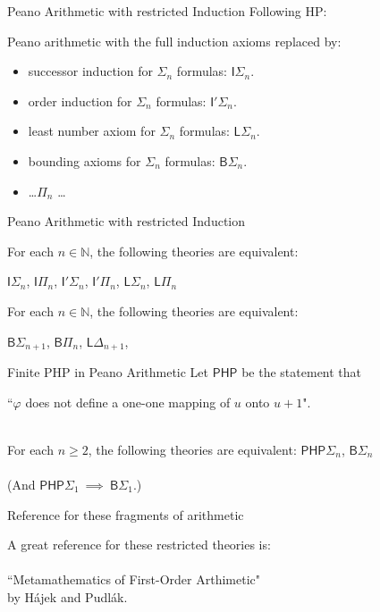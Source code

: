 \documentclass{beamer}
\newcommand{\vs}{\\~\\}
\begin{document}
\begin{frame}{Peano Arithmetic with restricted Induction}
  Following HP:

  Peano arithmetic with the full induction axioms replaced by:
  \begin{itemize}
    \item successor induction for $\Sigma_n$ formulas: $\mathsf{I}\Sigma_n$.
    \item order induction for $\Sigma_n$ formulas: $\mathsf{I}'\Sigma_n$.
    \item least number axiom for $\Sigma_n$ formulas: $\mathsf{L}\Sigma_n$.
    \item bounding axioms for $\Sigma_n$ formulas: $\mathsf{B}\Sigma_n$.
    \item \ldots $\Pi_n$ \ldots
  \end{itemize}
\end{frame}

\begin{frame}{Peano Arithmetic with restricted Induction}
  \begin{theorem}
    For each $n\in\mathbb{N}$,
    the following theories are equivalent:

    $\mathsf{I}\Sigma_n$,
    $\mathsf{I}\Pi_n$,
    $\mathsf{I}'\Sigma_n$,
    $\mathsf{I}'\Pi_n$,
    $\mathsf{L}\Sigma_n$,
    $\mathsf{L}\Pi_n$
  \end{theorem}

  \begin{theorem}
    For each $n\in\mathbb{N}$,
    the following theories are equivalent:

    $\mathsf{B}\Sigma_{n+1}$,
    $\mathsf{B}\Pi_n$,
    $\mathsf{L}\Delta_{n+1}$,
  \end{theorem}

\end{frame}

\begin{frame}{Finite PHP in Peano Arithmetic}
  Let $\mathsf{PHP}$ be the statement that

 ``$\varphi$ does not define a one-one mapping of $u$ onto $u+1$".
 \vs
 \begin{theorem}
   For each $n\geq 2$,
   the following theories are equivalent:
   $\mathsf{PHP}\Sigma_{n}$,
   $\mathsf{B}\Sigma_{n}$
   \vs
   (And $\mathsf{PHP}\Sigma_{1}~\implies~\mathsf{B}\Sigma_{1}$.)
 \end{theorem}
\end{frame}

\begin{frame}{Reference for these fragments of arithmetic}
  \begin{center}
  A great reference for these restricted theories is:
  \vs
  ``Metamathematics of First-Order Arthimetic"
  \\
  by H\'ajek and Pudl\'ak.
  \end{center}
\end{frame}
\end{document}
